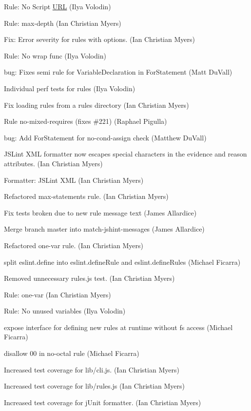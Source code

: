 \begin{DoxyItemize}
\item Rule\+: No Script \mbox{\hyperlink{namespace_u_r_l}{U\+RL}} (Ilya Volodin)
\item Rule\+: max-\/depth (Ian Christian Myers)
\item Fix\+: Error severity for rules with options. (Ian Christian Myers)
\item Rule\+: No wrap func (Ilya Volodin)
\item bug\+: Fixes semi rule for Variable\+Declaration in For\+Statement (Matt Du\+Vall)
\item Individual perf tests for rules (Ilya Volodin)
\item Fix loading rules from a rules directory (Ian Christian Myers)
\item Rule no-\/mixed-\/requires (fixes \#221) (Raphael Pigulla)
\item bug\+: Add For\+Statement for no-\/cond-\/assign check (Matthew Du\+Vall)
\item J\+S\+Lint X\+ML formatter now escapes special characters in the evidence and reason attributes. (Ian Christian Myers)
\item Formatter\+: J\+S\+Lint X\+ML (Ian Christian Myers)
\item Refactored {\ttfamily max-\/statements} rule. (Ian Christian Myers)
\item Fix tests broken due to new rule message text (James Allardice)
\item Merge branch \textquotesingle{}master\textquotesingle{} into match-\/jshint-\/messages (James Allardice)
\item Refactored {\ttfamily one-\/var} rule. (Ian Christian Myers)
\item split eslint.\+define into eslint.\+define\+Rule and eslint.\+define\+Rules (Michael Ficarra)
\item Removed unnecessary rules.\+js test. (Ian Christian Myers)
\item Rule\+: one-\/var (Ian Christian Myers)
\item Rule\+: No unused variables (Ilya Volodin)
\item expose interface for defining new rules at runtime without fs access (Michael Ficarra)
\item disallow 00 in no-\/octal rule (Michael Ficarra)
\item Increased test coverage for {\ttfamily lib/cli.\+js}. (Ian Christian Myers)
\item Increased test coverage for {\ttfamily lib/rules.\+js} (Ian Christian Myers)
\item Increased test coverage for j\+Unit formatter. (Ian Christian Myers)

\end{DoxyItemize}
